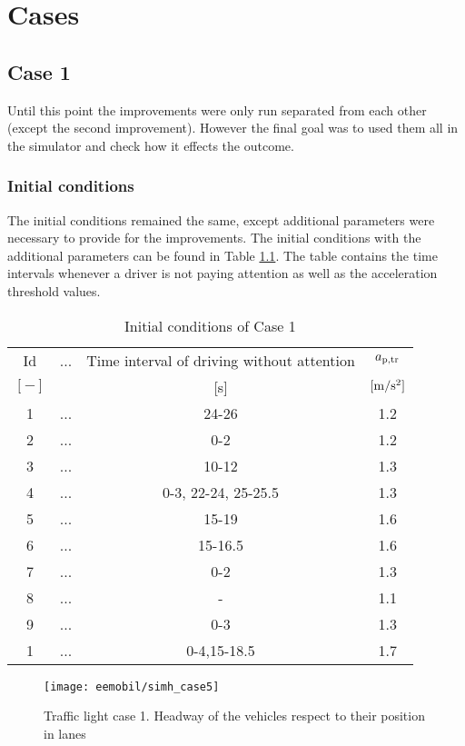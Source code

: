 \chapter{Cases}
		\section{Case 1}
			Until this point the improvements were only run separated from each other (except the second improvement). However the final goal was to used them all in the simulator and check how it effects the outcome.
			\subsection*{Initial conditions}
			The initial conditions remained the same, except additional parameters were necessary to provide for the improvements. The initial conditions with the additional parameters can be found in Table \ref{tab:new_array}. The table contains the time intervals whenever a driver is not paying attention as well as the acceleration threshold values.
			\begin{table}[ht]
				\begin{center}
					\begin{tabular}{ |c|c|c|c| }
						\hline
						Id & ... & Time interval of driving without attention & $a_{\rm p,tr}$\\
						$[-]$ & & [s]& $\rm [m/s^2]$\\
						\hline
						1 & ... & 24-26 & 1.2 \\
						2 & ... & 0-2 & 1.2 \\
						3 & ... & 10-12 & 1.3 \\
						4 & ... & 0-3, 22-24, 25-25.5 & 1.3 \\
						5 & ... & 15-19 & 1.6 \\
						6 & ... & 15-16.5 & 1.6 \\
						7 & ... & 0-2 & 1.3 \\
						8 & ... & - & 1.1 \\
						9 & ... & 0-3 & 1.3 \\
						1 & ... & 0-4,15-18.5 & 1.7 \\
						\hline
					\end{tabular}
				\end{center}
				\caption{Initial conditions of Case 1}
				\label{tab:new_array}
			\end{table}
			\begin{figure}
				\centering
				\texttt{[image: eemobil/simh\_case5]}
				\caption{Traffic light case 1. Headway of the vehicles respect to their position in lanes}
				\label{fig:red_light_situationh2}
			\end{figure}
